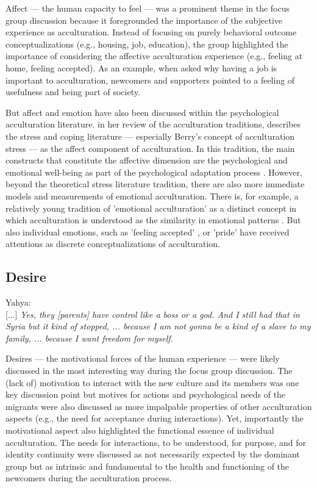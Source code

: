 \documentclass[man, 12pt, a4paper]{apa7}
\begin{document}
Affect --- the human capacity to feel \citep[including emotions and moods;][]{FeldmanBarrett2007} --- was a prominent theme in the focus group discussion because it foregrounded the importance of the subjective experience as acculturation. Instead of focusing on purely behavioral outcome conceptualizations (e.g., housing, job, education), the group highlighted the importance of considering the affective acculturation experience (e.g., feeling at home, feeling accepted). As an example, when asked why having a job is important to acculturation, newcomers and supporters pointed to a feeling of usefulness and being part of society. 

But affect and emotion have also been discussed within the psychological acculturation literature. \citet{Ward2001} in her review of the acculturation traditions, describes the stress and coping literature --- especially Berry's concept of acculturation stress \citep{Berry1997b} --- as the affect component of acculturation. In this tradition, the main constructs that constitute the affective dimension are the psychological and emotional well-being as part of the psychological adaptation process \citep[including, for example life satisfaction and depression;][]{Ward2019}. However, beyond the theoretical stress literature tradition, there are also more immediate models and measurements of emotional acculturation. There is, for example, a relatively young tradition of 'emotional acculturation' as a distinct concept in which acculturation is understood as the similarity in emotional patterns \citep[see][for a review]{DeLeersnyder2017}. But also individual emotions, such as 'feeling accepted' \citep{Jasini2018}, or 'pride' \citep{Suinn1995} have received attentions as discrete conceptualizations of acculturation. 

\subsection{Desire}
\begin{displayquote}
    Yahya:\\
    {[...]} \textit{Yes, they [parents] have control like a boss or a god. And I still had that in Syria but it kind of stopped, ... because I am not gonna be a kind of a slave to my family, ... because I want freedom for myself.}
\end{displayquote}

Desires --- the motivational forces of the human experience --- were likely discussed in the most interesting way during the focus group discussion. The (lack of) motivation to interact with the new culture and its members was one key discussion point but motives for actions and psychological needs of the migrants were also discussed as more impalpable properties of other acculturation aspects (e.g., the need for acceptance during interactions). Yet, importantly the motivational aspect also highlighted the functional essence of individual acculturation. The needs for interactions, to be understood, for purpose, and for identity continuity were discussed as not necessarily expected by the dominant group but as intrinsic and fundamental to the health and functioning of the newcomers during the acculturation process.
\end{document}
